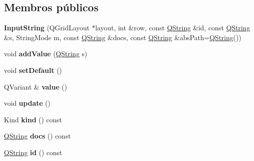 \subsection*{Membros públicos}
\begin{DoxyCompactItemize}
\item 
\hypertarget{class_input_string_aea5ceb7af09cd30e652132a3e8c14d4e}{{\bfseries Input\-String} (Q\-Grid\-Layout $\ast$layout, int \&row, const \hyperlink{class_q_string}{Q\-String} \&id, const \hyperlink{class_q_string}{Q\-String} \&s, String\-Mode m, const \hyperlink{class_q_string}{Q\-String} \&docs, const \hyperlink{class_q_string}{Q\-String} \&abs\-Path=\hyperlink{class_q_string}{Q\-String}())}\label{class_input_string_aea5ceb7af09cd30e652132a3e8c14d4e}

\item 
\hypertarget{class_input_string_a9aa786714a8df08747b73b206bf20adb}{void {\bfseries add\-Value} (\hyperlink{class_q_string}{Q\-String} s)}\label{class_input_string_a9aa786714a8df08747b73b206bf20adb}

\item 
\hypertarget{class_input_string_a931e435785e38acd1e3ecceb2f7ca6bc}{void {\bfseries set\-Default} ()}\label{class_input_string_a931e435785e38acd1e3ecceb2f7ca6bc}

\item 
\hypertarget{class_input_string_a5dd524f67ae7ed0efa64313fe71e4605}{Q\-Variant \& {\bfseries value} ()}\label{class_input_string_a5dd524f67ae7ed0efa64313fe71e4605}

\item 
\hypertarget{class_input_string_ac5c54df7ed3b930268c8d7752c101725}{void {\bfseries update} ()}\label{class_input_string_ac5c54df7ed3b930268c8d7752c101725}

\item 
\hypertarget{class_input_string_aa9d037bed9f9a083d0cd01485637d843}{Kind {\bfseries kind} () const }\label{class_input_string_aa9d037bed9f9a083d0cd01485637d843}

\item 
\hypertarget{class_input_string_ab817379a6af112723841e17901826ec2}{\hyperlink{class_q_string}{Q\-String} {\bfseries docs} () const }\label{class_input_string_ab817379a6af112723841e17901826ec2}

\item 
\hypertarget{class_input_string_a06be2d738a4fe9fdb941cb24161b26c0}{\hyperlink{class_q_string}{Q\-String} {\bfseries id} () const }\label{class_input_string_a06be2d738a4fe9fdb941cb24161b26c0}


\end{DoxyCompactItemize}
